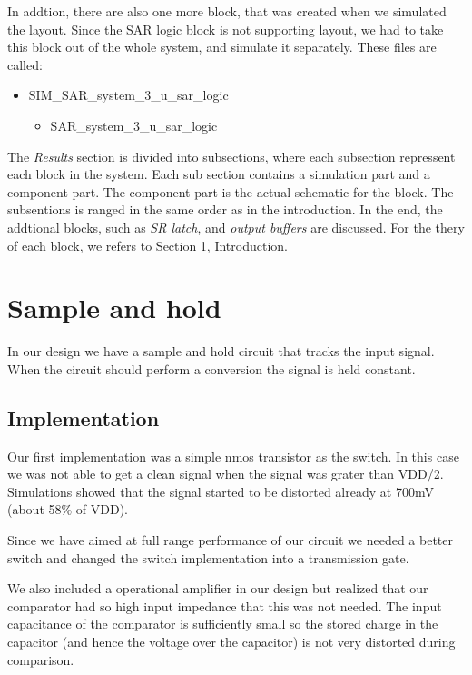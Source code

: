 \documentclass[english, 12pt, a4paper]{ifimaster}
\begin{document}
In addtion, there are also one more block, that was created when we simulated the layout. Since the SAR logic block is not supporting layout, we had to take this block out of the whole system, 
and simulate it separately. These files are called:
\begin{itemize}
 \item SIM\_SAR\_system\_3\_u\_sar\_logic
 \begin{itemize}
  \item SAR\_system\_3\_u\_sar\_logic
 \end{itemize}
\end{itemize}
The \textit{Results} section is divided into subsections, where each subsection repressent each block in the system. Each sub section contains a simulation part and a component part. 
The component part is the actual schematic for the block. The subsentions is ranged in the same order as in the introduction. In the end, the addtional blocks, such as \textit{SR latch}, and 
\textit{output buffers} are discussed. For the thery of each block, we refers to Section 1, Introduction. 

\section{Sample and hold}
In our design we have a sample and hold circuit that tracks the input signal. When the circuit should perform a conversion the signal is held constant.

\subsection{Implementation}
Our first implementation was a simple nmos transistor as the switch. In this case we was not able to get a clean signal when the signal was grater than VDD/2. 
Simulations showed that the signal started to be distorted already at 700mV (about 58\% of VDD).

Since we have aimed at full range performance of our circuit we needed a better switch and changed the switch implementation into a transmission gate. 

We also included a operational amplifier in our design but realized that our comparator had so high input impedance that this was not needed. The input capacitance of the 
comparator is sufficiently small so the stored charge in the capacitor (and hence the voltage over the capacitor) is not very distorted during comparison.
\end{document}
